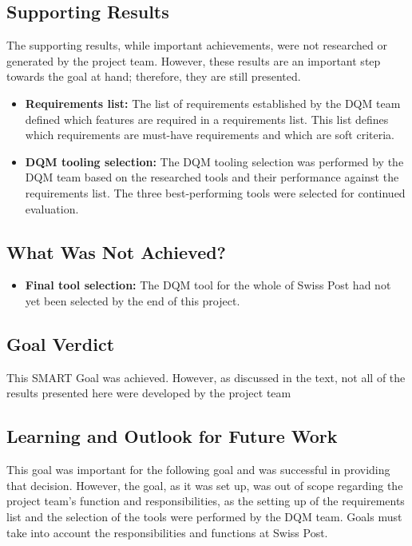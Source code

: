 \subsection*{Supporting Results}

The supporting results, while important achievements, were not researched or generated by the project team. However, these results are an important step towards the goal at hand; therefore, they are still presented.

\begin{itemize}
\item \textbf{Requirements list:} The list of requirements established by the DQM team defined which features are required in a requirements list. This list defines which requirements are must-have requirements and which are soft criteria.

\item \textbf{DQM tooling selection:} The DQM tooling selection was performed by the DQM team based on the researched tools and their performance against the requirements list. The three best-performing tools were selected for continued evaluation.

\end{itemize}




\subsection*{What Was Not Achieved?}

\begin{itemize}
    
\item \textbf{Final tool selection:} The DQM tool for the whole of Swiss Post had not yet been selected by the end of this project.

\end{itemize}

\subsection*{Goal Verdict}

This SMART Goal was achieved. However, as discussed in the text, not all of the results presented here were developed by the project team


\subsection*{Learning and Outlook for Future Work}

This goal was important for the following goal and was successful in providing that decision. However, the goal, as it was set up, was out of scope regarding the project team's function and responsibilities, as the setting up of the requirements list and the selection of the tools were performed by the DQM team. Goals must take into account the responsibilities and functions at Swiss Post.